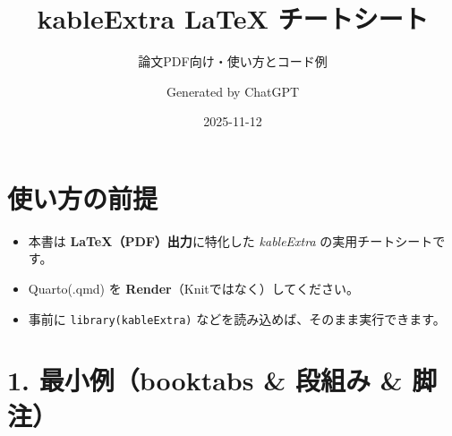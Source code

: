 \documentclass[
  japanese,
  letterpaper,
  DIV=11,
  numbers=noendperiod]{scrartcl}
\title{kableExtra LaTeX チートシート}
\subtitle{論文PDF向け・使い方とコード例}
\author{Generated by ChatGPT}
\date{2025-11-12}
\providecommand{\tightlist}{%
  \setlength{\itemsep}{0pt}\setlength{\parskip}{0pt}}
\begin{document}
\maketitle


\section{使い方の前提}\label{ux4f7fux3044ux65b9ux306eux524dux63d0}

\begin{itemize}
\tightlist
\item
  本書は \textbf{LaTeX（PDF）出力}に特化した \emph{kableExtra}
  の実用チートシートです。\\
\item
  Quarto(.qmd) を \textbf{Render}（Knitではなく）してください。\\
\item
  事前に \texttt{library(kableExtra)}
  などを読み込めば、そのまま実行できます。
\end{itemize}

\section{1. 最小例（booktabs \& 段組み \&
脚注）}\label{ux6700ux5c0fux4f8bbooktabs-ux6bb5ux7d44ux307f-ux811aux6ce8}

\begin{table}

\caption{\label{tbl-minimal}最小レシピ：段組みと脚注}


\end{table}%
\end{document}
